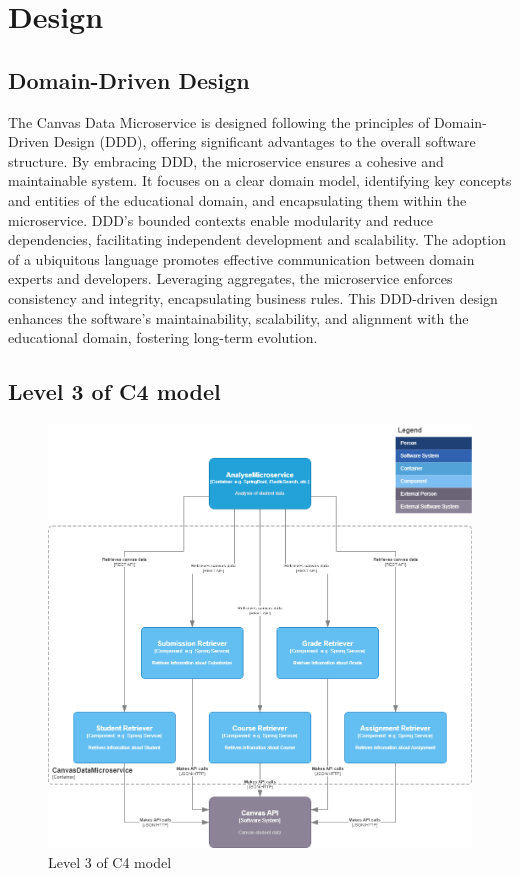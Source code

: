 \documentclass[a4paper, 11pt]{article}
\begin{document}
\section{Design}


\subsection{Domain-Driven Design}
The Canvas Data Microservice is designed following the principles of Domain-Driven Design (DDD), offering significant advantages to the overall software structure. By embracing DDD, the microservice ensures a cohesive and maintainable system. It focuses on a clear domain model, identifying key concepts and entities of the educational domain, and encapsulating them within the microservice. DDD's bounded contexts enable modularity and reduce dependencies, facilitating independent development and scalability. The adoption of a ubiquitous language promotes effective communication between domain experts and developers. Leveraging aggregates, the microservice enforces consistency and integrity, encapsulating business rules. This DDD-driven design enhances the software's maintainability, scalability, and alignment with the educational domain, fostering long-term evolution.


\subsection{Level 3 of C4 model}
\begin{figure}[H]
    \includegraphics[width=\linewidth]{QSc4_3_CanvasDataMicroservice.png}
    \caption{Level 3 of C4 model}
    \label{fig:Level 3 of C4 model}
\end{figure}
\end{document}
